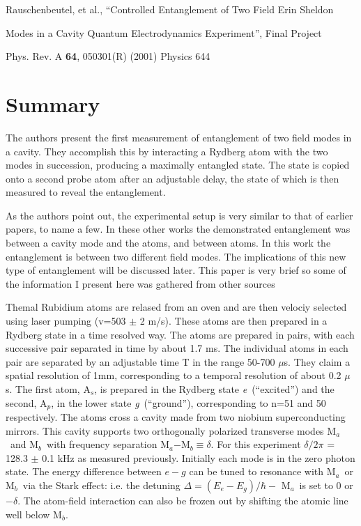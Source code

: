 \documentclass[12pt]{article}
\newcommand{\As}{A$_s$}
\newcommand{\Ap}{A$_p$}
\newcommand{\Ma}{M$_a$}
\newcommand{\Mb}{M$_b$}
\newcommand{\micros}{$\mu$s}
\newcommand{\es}{{\it e}}
\newcommand{\gs}{{\it g}}
\begin{document}
\footnotesize
\noindent
{Rauschenbeutel, et al., ``Controlled Entanglement of Two Field } \hfill {Erin Sheldon}

{Modes in a Cavity Quantum Electrodynamics Experiment'',} \hfill {Final Project}

{Phys. Rev. A {\bf64}, 050301(R) (2001)} \hfill {Physics 644}

\normalsize

\section*{Summary}
The authors present the first measurement of entanglement of two field modes
in a cavity. They accomplish this by interacting a Rydberg atom with the two
modes in succession, producing a maximally entangled state. The state is copied
onto a second probe atom after an adjustable delay, the state of which is then
measured to reveal the entanglement.

As the authors point out, the experimental setup is very similar to that of 
earlier papers, \cite{rausch00,brune96,nogues99} to name a few. 
In these other works the demonstrated 
entanglement was between a cavity mode and the atoms, and between atoms. In this
work the entanglement is between two different field modes. The implications of this
new type of entanglement will be discussed later. This paper is very brief so 
some of the information I present here was gathered from other sources

Themal Rubidium atoms are relased from an oven and are then velociy selected
using laser pumping (v=503 $\pm$ 2 m/s). These atoms are then prepared in a 
Rydberg state in a time resolved way. 
The atoms are prepared in pairs, with each 
successive pair separated in time
by about 1.7 ms. 
The individual atoms in each pair 
are separated by an adjustable time T in the range 50-700 \micros.
They claim a spatial resolution of 1mm, corresponding to
a temporal resolution of about 0.2 \micros. 
The first atom, \As, is prepared in the Rydberg state \es\ (``excited'') and the 
second, \Ap,  in the lower state \gs\ (``ground''), 
corresponding to n=51 and 50 respectively. The atoms cross a cavity made
from two niobium superconducting mirrors. This cavity supports two orthogonally
polarized transverse
modes \Ma\ and \Mb\, with frequency 
separation \Ma$-$\Mb$\equiv \delta$. For this experiment
$\delta/2\pi$ = 128.3 $\pm$ 0.1 kHz as measured previously.
Initially each mode is in the
zero photon state. The energy difference between $e-g$ can be 
tuned to resonance with \Ma\ or \Mb\ via the Stark effect: i.e. the 
detuning $\Delta = (E_e-E_g)/\hbar - $
\Ma\ is set to 0 or $-\delta$. 
The atom-field interaction can also be frozen out by shifting
 the atomic line well below \Mb.
\end{document}
